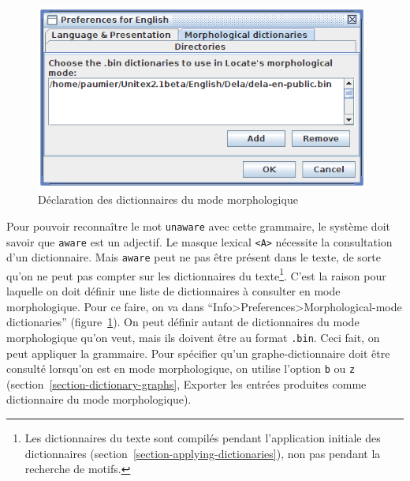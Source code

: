 \begin{figure}[!ht]
\begin{center}
\includegraphics[width=11cm]{resources/img/fig6-17n.png}
\caption{Déclaration des dictionnaires du mode morphologique\label{fig-morpho4}}
\end{center}
\end{figure}

\bigskip
\noindent Pour pouvoir reconnaître le mot 
\verb+unaware+ avec cette grammaire, le système doit savoir que \verb+aware+ est un adjectif. 
Le masque lexical \verb+<A>+ nécessite la consultation d'un dictionnaire. Mais
\verb+aware+ peut ne pas être présent dans le texte, de sorte qu'on ne peut pas compter
sur les dictionnaires du texte\footnote{Les dictionnaires du texte sont compilés pendant l'application
initiale des dictionnaires (section~\ref{section-applying-dictionaries}), non pas pendant la recherche
de motifs.}.
C'est la raison pour laquelle on doit définir une liste de
dictionnaires à consulter en mode morphologique.
Pour ce faire, on va dans ``Info>Preferences>Morphological-mode dictionaries''
(figure~\ref{fig-morpho4}).
On peut définir autant de dictionnaires du mode morphologique qu'on veut, mais ils doivent
être au format \verb+.bin+. Ceci fait, on peut appliquer la grammaire.
Pour spécifier qu'un graphe-dictionnaire doit être consulté lorsqu'on est en mode morphologique,
on utilise l'option \verb+b+ ou \verb+z+ (section~\ref{section-dictionary-graphs}, Exporter les entrées produites
comme dictionnaire du mode morphologique).

